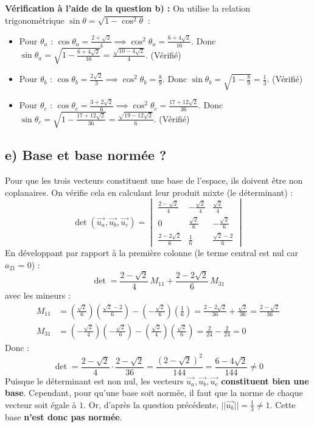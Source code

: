 \documentclass[11pt,a4paper]{article}
\begin{document}
\textbf{Vérification à l'aide de la question b) :}
On utilise la relation trigonométrique $\sin\theta = \sqrt{1 - \cos^2\theta}$ :
\begin{itemize}
    \item Pour $\theta_a$ : $\cos\theta_a = \frac{2+\sqrt{2}}{4} \implies \cos^2\theta_a = \frac{6+4\sqrt{2}}{16}$. Donc $\sin\theta_a = \sqrt{1 - \frac{6+4\sqrt{2}}{16}} = \frac{\sqrt{10-4\sqrt{2}}}{4}$. (Vérifié)
    \item Pour $\theta_b$ : $\cos\theta_b = \frac{2\sqrt{2}}{3} \implies \cos^2\theta_b = \frac{8}{9}$. Donc $\sin\theta_b = \sqrt{1 - \frac{8}{9}} = \frac{1}{3}$. (Vérifié)
    \item Pour $\theta_c$ : $\cos\theta_c = \frac{3+2\sqrt{2}}{6} \implies \cos^2\theta_c = \frac{17+12\sqrt{2}}{36}$. Donc $\sin\theta_c = \sqrt{1 - \frac{17+12\sqrt{2}}{36}} = \frac{\sqrt{19-12\sqrt{2}}}{6}$. (Vérifié)
\end{itemize}

\subsection*{e) Base et base normée ?}
Pour que les trois vecteurs constituent une base de l'espace, ils doivent être non coplanaires. On vérifie cela en calculant leur produit mixte (le déterminant) :
$$ \det(\vec{u_a}, \vec{u_b}, \vec{u_c}) = 
\begin{vmatrix} 
\frac{2-\sqrt{2}}{4} & -\frac{\sqrt{2}}{4} & \frac{\sqrt{2}}{4} \\[2mm]
0 & \frac{\sqrt{2}}{6} & -\frac{\sqrt{2}}{6} \\[2mm]
\frac{2-2\sqrt{2}}{6} & \frac{1}{6} & \frac{\sqrt{2}-2}{6}
\end{vmatrix} 
$$
En développant par rapport à la première colonne (le terme central est nul car $a_{21}=0$) :
$$ \det = \frac{2-\sqrt{2}}{4}\, M_{11} + \frac{2-2\sqrt{2}}{6}\, M_{31} $$
avec les mineurs :
\begin{align*}
M_{11} &= \left(\frac{\sqrt{2}}{6}\right)\left(\frac{\sqrt{2}-2}{6}\right) - \left(-\frac{\sqrt{2}}{6}\right)\left(\frac{1}{6}\right) = \frac{2-2\sqrt{2}}{36} + \frac{\sqrt{2}}{36} = \frac{2-\sqrt{2}}{36} \\
M_{31} &= \left(-\frac{\sqrt{2}}{4}\right)\left(-\frac{\sqrt{2}}{6}\right) - \left(\frac{\sqrt{2}}{4}\right)\left(\frac{\sqrt{2}}{6}\right) = \frac{2}{24} - \frac{2}{24} = 0
\end{align*}
Donc :
$$ \det = \frac{2-\sqrt{2}}{4} \cdot \frac{2-\sqrt{2}}{36} = \frac{(2-\sqrt{2})^2}{144} = \frac{6-4\sqrt{2}}{144} \neq 0 $$
Puisque le déterminant est non nul, les vecteurs $\vec{u_a}, \vec{u_b}, \vec{u_c}$ \textbf{constituent bien une base}. 
Cependant, pour qu'une base soit normée, il faut que la norme de chaque vecteur soit égale à $1$. Or, d'après la question précédente, $||\vec{u_b}|| = \frac{1}{3} \neq 1$. Cette base \textbf{n'est donc pas normée}.
\end{document}
